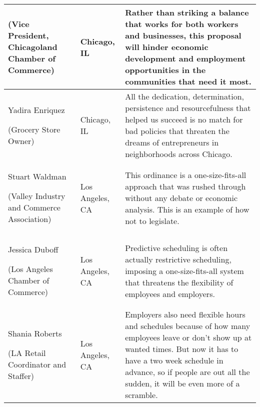 \begin{tabular}{>{\raggedright}p{}|>{\raggedright}p{}|>{\raggedright}p{}}
(Vice President, Chicagoland Chamber of Commerce) & Chicago, IL & Rather than striking a balance that works for both workers and businesses,
this proposal will hinder economic development and employment opportunities
in the communities that need it most. \tabularnewline
\hline 
Yadira Enriquez 

(Grocery Store Owner) & Chicago, IL & All the dedication, determination, persistence and resourcefulness
that helped us succeed is no match for bad policies that threaten
the dreams of entrepreneurs in neighborhoods across Chicago.\tabularnewline
\hline 
Stuart Waldman 

(Valley Industry and Commerce Association) & Los Angeles, CA & This ordinance is a one-size-fits-all approach that was rushed through
without any debate or economic analysis. This is an example of how
not to legislate.\tabularnewline
\hline 
Jessica Duboff 

(Los Angeles Chamber of Commerce) & Los Angeles, CA & Predictive scheduling is often actually restrictive scheduling, imposing
a one-size-fits-all system that threatens the flexibility of employees
and employers.\tabularnewline
\hline 
Shania Roberts

(LA Retail Coordinator and Staffer) & Los Angeles, CA & Employers also need flexible hours and schedules because of how many
employees leave or don\textquoteright t show up at wanted times. But
now it has to have a two week schedule in advance, so if people are
out all the sudden, it will be even more of a scramble.\tabularnewline
\end{tabular}
